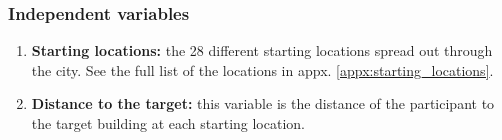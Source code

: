 \subsubsection{Independent variables}

\begin{enumerate}
	\item \textbf{Starting locations:} the 28 different starting locations spread out through the city. See the full list of the locations in appx. \ref{appx:starting_locations}. \\
	
	\item \textbf{Distance to the target:} this variable is the distance of the participant to the target building at each starting location.
\end{enumerate}


